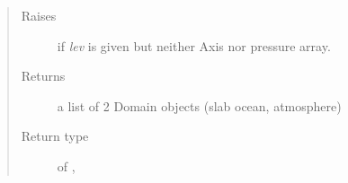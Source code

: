 \documentclass[letterpaper,10pt,english]{sphinxmanual}
\begin{document}
\begin{fulllineitems}
\begin{quote}
\begin{description}
\item[{Raises}] \leavevmode
{}  if \emph{lev} is given but neither Axis nor pressure array.

\item[{Returns}] \leavevmode
a list of 2 Domain objects (slab ocean, atmosphere)

\item[{Return type}] \leavevmode
\href{http://docs.python.org/2.7/library/functions.html\#list}{} of {\hyperref[api/climlab.domain:climlab.domain.domain.SlabOcean]{\emph{}}}, {\hyperref[api/climlab.domain:climlab.domain.domain.Atmosphere]{\emph{}}}

\end{description}\end{quote}

\end{fulllineitems}

\end{document}
